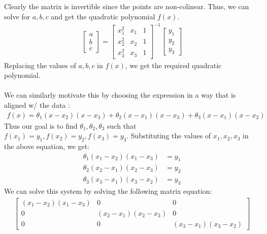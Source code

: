 \documentclass[answers,12pt,addpoints]{exam}
\begin{document}
\begin{questions}
\begin{solution}
        Clearly the matrix is invertible since the points are non-colinear. Thus, we can solve for $a, b, c$ and get the quadratic polynomial $f(x)$.
        \begin{align*}
            \begin{bmatrix}
                a\\
                b\\
                c
            \end{bmatrix} = 
            \begin{bmatrix}
                x_1^2 & x_1 & 1\\
                x_2^2 & x_2 & 1\\
                x_3^2 & x_3 & 1
            \end{bmatrix}^{-1}
            \begin{bmatrix}
                y_1\\
                y_2\\
                y_3
            \end{bmatrix}
        \end{align*}
        Replacing the values of $a, b, c$ in $f(x)$, we get the required quadratic polynomial.\\\\
        We can similarly motivate this by choosing the expression in a way that is aligned w/ the data :
        \begin{align*}
            f(x) = \theta_1 (x - x_2)(x - x_3) + \theta_2 (x - x_1)(x - x_3) + \theta_3 (x - x_1)(x - x_2)
        \end{align*}
        Thus our goal is to find $\theta_1, \theta_2, \theta_3$ such that $f(x_1) = y_1, f(x_2) = y_2, f(x_3) = y_3$. Substituting the values of $x_1, x_2, x_3$ in the above equation, we get:
        \begin{align*}
            \theta_1 (x_1 - x_2)(x_1 - x_3) &= y_1\\
            \theta_2 (x_2 - x_1)(x_2 - x_3) &= y_2\\
            \theta_3 (x_3 - x_1)(x_3 - x_2) &= y_3
        \end{align*}
        We can solve this system by solving the following matrix equation:
        \begin{align*}
            \begin{bmatrix}
                (x_1 - x_2)(x_1 - x_3) & 0 & 0\\
                0 & (x_2 - x_1)(x_2 - x_3) & 0\\
                0 & 0 & (x_3 - x_1)(x_3 - x_2)

\end{bmatrix}
\end{align*}
\end{solution}
\end{questions}
\end{document}
